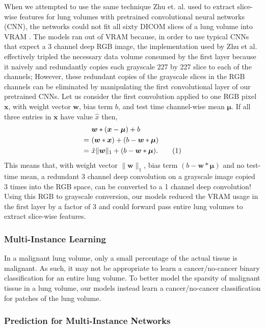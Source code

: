 \documentclass[twocolumn,10pt]{article}
\renewcommand{\b}{\boldsymbol}
\newcommand\numberthis{\addtocounter{equation}{1}\tag{\theequation}}
\begin{document}
When we attempted to use the same technique Zhu et. al. 
  used to extract slice-wise features for lung 
  volumes with pretrained convolutional neural networks (CNN),
  the networks could not fit all sixty DICOM slices of a lung volume
  into VRAM \cite{DBLP:journals/corr/ZhuLVX16}. 
  The models ran out of VRAM because, in order to use typical CNNs that 
  expect a 3 channel deep RGB image, the implementation used by Zhu et al. 
  effectively tripled the necessary data volume consumed by the first layer because it
  naively and redundantly copies each grayscale 227 by 227 slice to each of the channels;
  However, these redundant copies of the
  grayscale slices in the RGB channels can be eliminated by manipulating the first convolutional
  layer of our pretrained CNNs. 
  Let us consider the first convolution applied to one RGB pixel $\b x$,  with weight vector $\b w$, 
  bias term $b$, and test time channel-wise mean $\b \mu$. 
  If all three
  entries in $\b x$ have value $\hat x$ then,
  \begin{align*}
& \ \b w \ast (\b x - \b \mu) + b \\
= & \ (\b w \ast \b x) + (b - \b w \ast \b \mu)\\
= & \ \hat x \|\b w\|_1 + (b - \b w \ast \b \mu).
\numberthis
\end{align*}
  This means that, with weight vector $\|\b w\|_1$, bias term $(b - \b w \ast \b \mu)$ 
  and no test-time mean, a redundant 3 channel deep convolution on a
  grayscale image copied 3 times into the RGB space, can be converted
   to a 1 channel deep convolution!
  Using this RGB to grayscale conversion, our models reduced the VRAM usage in the
  first layer by a factor of 3 and could forward pass entire
  lung volumes to extract slice-wise features.



\subsubsection{Multi-Instance Learning}
In a malignant lung volume, only a small percentage of the actual tissue is
 malignant.  As such, it may not be appropriate to learn a cancer/no-cancer
 binary classification for an entire lung volume. To better model the
 sparsity of malignant tissue in a lung volume, our models instead learn a 
 cancer/no-cancer classification for patches of the lung volume.

\subsubsection{Prediction for Multi-Instance Networks}
\end{document}
